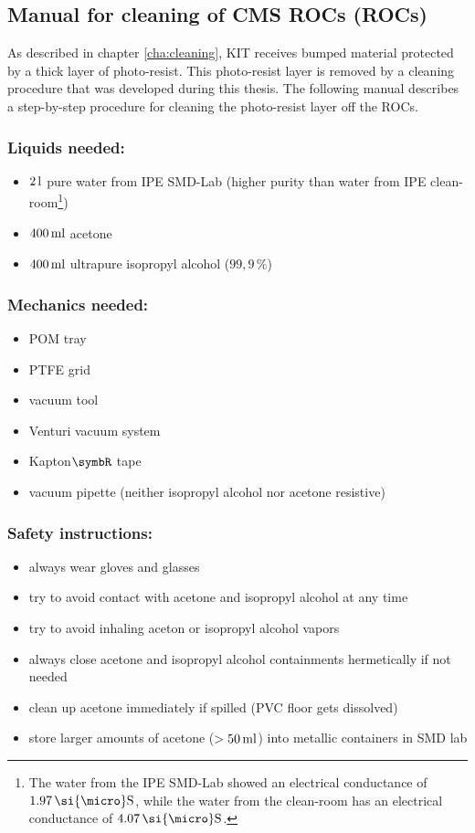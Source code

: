 \begin{appendices}
\chapter{Manual for cleaning of \acs{CMS} \acl{ROC}s (\acs{ROC}s)}\label{app:cleaning_manual}
As described in chapter \ref{cha:cleaning}, KIT receives bumped material protected by a thick layer of photo-resist. This photo-resist layer is removed by a cleaning procedure that was developed during this thesis. The following manual describes a step-by-step procedure for cleaning the photo-resist layer off the \ac{ROC}s.
\subsection*{Liquids needed:}
\begin{itemize}
\item $2\,\rm{l}$ pure water from \ac{IPE} SMD-Lab (higher purity than water from \ac{IPE} clean-room\footnote{The water from the \ac{IPE} SMD-Lab showed an electrical conductance of $1.97\,\si{\micro}\rm{S}$, while the water from the clean-room has an electrical conductance of $4.07\,\si{\micro}\rm{S}$.})
\item $400\,\rm{ml}$ acetone
\item $400\,\rm{ml}$ ultrapure isopropyl alcohol ($99,9\,\%$)
\end{itemize}

\subsection*{Mechanics needed:}
\begin{itemize}
\item \ac{POM} tray
\item \ac{PTFE} grid
\item vacuum tool
\item Venturi vacuum system
\item Kapton$\rm{\symbR}$ tape
\item vacuum pipette (neither isopropyl alcohol nor acetone resistive)
\end{itemize}
\subsection*{Safety instructions:}
\begin{itemize}
\item always wear gloves and glasses
\item try to avoid contact with acetone and isopropyl alcohol at any time
\item try to avoid inhaling aceton or isopropyl alcohol vapors
\item always close acetone and isopropyl alcohol containments hermetically if not needed
\item clean up acetone immediately if spilled (PVC floor gets dissolved)
\item store larger amounts of acetone ($>50\,\rm{ml}$) into metallic containers in SMD lab
\end{itemize}


\end{appendices}
